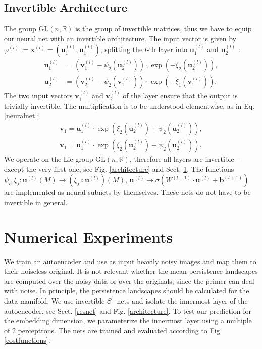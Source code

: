 \documentclass[envcountsect,runningheads]{llncs}
\begin{document}
\subsection{Invertible Architecture}
\label{subsec:invertibleneuralnets}
The group $\text{GL}(n,\mathbb{R})$ is the group of invertible matrices, thus we have to equip our neural net with an invertible architecture. The input vector is given by $\varphi^{(l)} := \textbf{x}^{(l)} = (\textbf{u}^{(l)}_{1},\textbf{u}^{(l)}_{1})$, splitting the $l$-th layer into $\textbf{u}^{(l)}_1$ and $\textbf{u}^{(l)}_2$ :
\begin{align}
	\textbf{u}^{(l)}_{1} &= \left(\textbf{v}^{(l)}_1 - \psi_2\left(\textbf{u}^{(l)}_2\right)\right) \cdot \exp\left(-\xi_2\left(\textbf{u}^{(l)}_2\right)\right), \\
	\textbf{u}^{(l)}_{2} &= \left(\textbf{v}^{(l)}_2 - \psi_2\left(\textbf{v}^{(l)}_1\right)\right) \cdot \exp\left(-\xi_1\left(\textbf{v}^{(l)}_1\right)\right).
\end{align}
The two input vectors $\textbf{v}^{(l)}_1$ and $\textbf{v}^{(l)}_2$ of the layer ensure that the output is trivially invertible. The multiplication is to be understood elementwise, as in Eq. \ref{neuralnet}:
\begin{align}
	\textbf{v}_1 = \textbf{u}^{(l)}_{1} \cdot \exp\left(\xi_2\left(\textbf{u}^{(l)}_{2}\right) + \psi_2\left(\textbf{u}^{(l)}_{2}\right)\right), \\
	\textbf{v}_1 = \textbf{u}^{(l)}_{1} \cdot \exp\left(\xi_2\left(\textbf{u}^{(l)}_{2}\right) + \psi_2\left(\textbf{u}^{(l)}_{2}\right)\right).
\end{align} 
We operate on the Lie group $\text{GL}(n,\mathbb{R})$, therefore all layers are invertible -- except the very first one, see Fig. \ref{architecture} and Sect. \ref{sec:numericalexperiments}. The functions $\psi_i,\xi_j: \textbf{u}^{(l)}\left(M\right) \rightarrow \left(\xi_j \circ \textbf{u}^{(l)}\right)\left(M\right)$, $\textbf{u}^{(l)} \mapsto \sigma\left(W^{(l+1)} \cdot \textbf{u}^{(l)} + \textbf{b}^{(l+1)}\right)$ are implemented as neural subnets by themselves. These nets do not have to be invertible in general.

\section{Numerical Experiments}
\label{sec:numericalexperiments}

We train an autoencoder and use as input heavily noisy images and map them to their noiseless original. It is not relevant whether the mean persistence landscapes are computed over the noisy data or over the originals, since the primer can deal with noise. In principle, the persistence landscapes should be calculated for the data manifold. We use invertible $\mathcal{C}^1$-nets and isolate the innermost layer of the autoencoder, see Sect. \ref{resnet} and Fig. \ref{architecture}. To test our prediction for the embedding dimension, we parameterize the innermost layer using a multiple of $2$ perceptrons. The nets are trained and evaluated according to Fig. \ref{costfunctions}.
\end{document}
